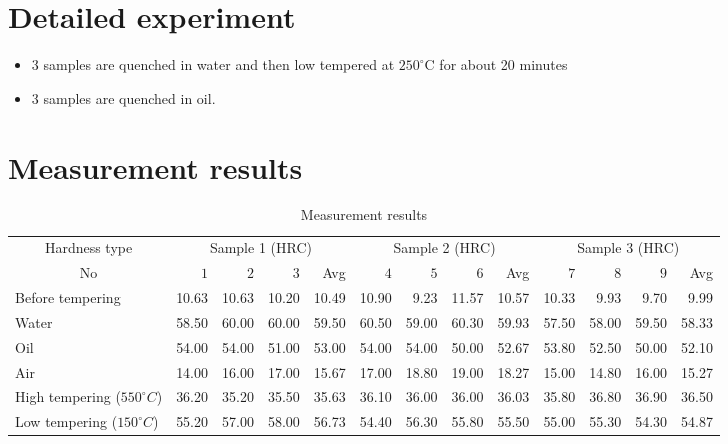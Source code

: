 \section{Detailed experiment}
\begin{itemize}
	\item 3 samples are quenched in water and then low tempered at $ 250^\circ $C for about 20 minutes
	\item 3 samples are quenched in oil.
\end{itemize}
\section{Measurement results}\clearpage
\begin{landscape}
	\vspace*{\fill}
	\renewcommand{\arraystretch}{1.5}
	\begin{table}[ht]
		\begin{tabular}[ht]{lrrrrrrrrrrrr}
			\toprule
			\multicolumn{1}{c}{Hardness type} & \multicolumn{4}{c}{Sample 1 (HRC)}  & \multicolumn{4}{c}{Sample 2 (HRC)}  & \multicolumn{4}{c}{Sample 3 (HRC)}\\
			\cmidrule{2-5}\cmidrule{6-9}\cmidrule{10-13} \multicolumn{1}{c}{No} & $ 1 $ & $ 2 $ & $ 3 $ & Avg & $ 4 $ & $ 5 $ & $ 6 $ & Avg & $ 7 $ & $ 8 $ & $ 9 $ & Avg\\\midrule
			\rowcolor{lightgray!20}{\cellcolor[HTML]{C0C0C0}}Before tempering &10.63&10.63&10.20 & 10.49 & 10.90&9.23&11.57&10.57&10.33  &9.93&9.70&9.99\\
			{\cellcolor[HTML]{C0C0C0}}Water &58.50&60.00&60.00&59.50&60.50&59.00&60.30&59.93&57.50&58.00&59.50&58.33\\
			\rowcolor{lightgray!20}{\cellcolor[HTML]{C0C0C0}}Oil &54.00&54.00&51.00&53.00&54.00&54.00&50.00&52.67&53.80&52.50&50.00&52.10\\		{\cellcolor[HTML]{C0C0C0}}Air &14.00&16.00&17.00&15.67&17.00&18.80&19.00&18.27&15.00&14.80&16.00&15.27\\		\rowcolor{lightgray!20}{\cellcolor[HTML]{C0C0C0}}High tempering ($ 550^\circ C $) &36.20&35.20&35.50&35.63&36.10&36.00&36.00&36.03&35.80&36.80&36.90&36.50\\		{\cellcolor[HTML]{C0C0C0}}Low tempering ($ 150^\circ C $) &55.20&57.00&58.00&56.73&54.40&56.30&55.80&55.50&55.00&55.30&54.30&54.87\\\bottomrule
		\end{tabular}
		\caption{Measurement results}
	\end{table}
	
	\vspace*{\fill}
\end{landscape}
